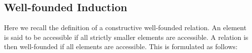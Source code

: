\begin{code}[hide]
\AgdaSpace{}%
\AgdaSpace{}%
\AgdaSpace{}%
\AgdaSpace{}%
\AgdaSpace{}%
\AgdaSpace{}%
\AgdaSpace{}%
\AgdaSpace{}%
\AgdaSpace{}%
\<%
\\
%
\>[4]\AgdaSpace{}%
\AgdaSymbol{(}\AgdaSpace{}%
\AgdaSymbol{)}\AgdaSpace{}%
\AgdaSymbol{=}\AgdaSpace{}%
\<%
\\
%
\\[\AgdaEmptyExtraSkip]%
%
\>[4]\AgdaSpace{}%
\AgdaSpace{}%
\<%
\end{code}

\subsection{Well-founded Induction}
\label{subsec:wf}
Here we recall the definition of a constructive well-founded relation.
An element is said to be accessible if all strictly smaller elements are accessible.
A relation is then well-founded if all elements are accessible.
This is formulated as follows:



